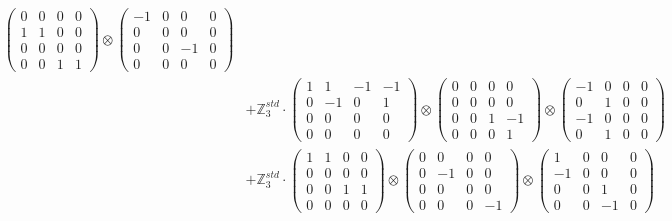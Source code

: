 \documentclass{article}
\begin{document}
{\begin{align}
            \begin{pmatrix} 0 & 0 & 0 & 0 \\ 1 & 1 & 0 & 0 \\ 0 & 0 & 0 & 0 \\ 0 & 0 & 1 & 1 \end{pmatrix} \otimes 
            \begin{pmatrix} -1 & 0 & 0 & 0 \\ 0 & 0 & 0 & 0 \\ 0 & 0 & -1 & 0 \\ 0 & 0 & 0 & 0 \end{pmatrix} \\ 
        &+ \label{Rs1-Rc16-Solution-5-c10} \mathbb{Z}_3^{std} \cdot 
            \begin{pmatrix} 1 & 1 & -1 & -1 \\ 0 & -1 & 0 & 1 \\ 0 & 0 & 0 & 0 \\ 0 & 0 & 0 & 0 \end{pmatrix} \otimes 
            \begin{pmatrix} 0 & 0 & 0 & 0 \\ 0 & 0 & 0 & 0 \\ 0 & 0 & 1 & -1 \\ 0 & 0 & 0 & 1 \end{pmatrix} \otimes 
            \begin{pmatrix} -1 & 0 & 0 & 0 \\ 0 & 1 & 0 & 0 \\ -1 & 0 & 0 & 0 \\ 0 & 1 & 0 & 0 \end{pmatrix} \\ 
        &+ \label{Rs1-Rc16-Solution-5-c11} \mathbb{Z}_3^{std} \cdot 
            \begin{pmatrix} 1 & 1 & 0 & 0 \\ 0 & 0 & 0 & 0 \\ 0 & 0 & 1 & 1 \\ 0 & 0 & 0 & 0 \end{pmatrix} \otimes 
            \begin{pmatrix} 0 & 0 & 0 & 0 \\ 0 & -1 & 0 & 0 \\ 0 & 0 & 0 & 0 \\ 0 & 0 & 0 & -1 \end{pmatrix} \otimes 
            \begin{pmatrix} 1 & 0 & 0 & 0 \\ -1 & 0 & 0 & 0 \\ 0 & 0 & 1 & 0 \\ 0 & 0 & -1 & 0 \end{pmatrix} \\ 

\end{align}}
\end{document}
